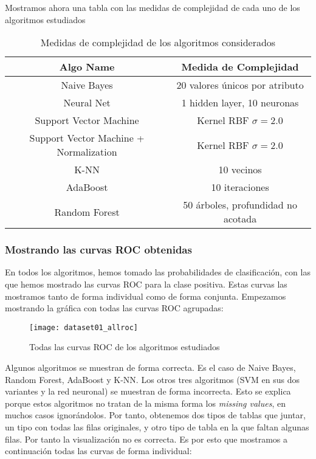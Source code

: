 \documentclass[11pt]{article}
\begin{document}
Mostramos ahora una tabla con las medidas de complejidad de cada uno de los algoritmos estudiados

\begin{table}[H]
\begin{center}
    \begin{tabular}{|c|c|}
        \hline
        Algo Name & Medida de Complejidad \\
        \hline
        Naive Bayes& 20 valores únicos por atributo \\
        Neural Net & 1 hidden layer, 10 neuronas \\
        Support Vector Machine& Kernel RBF $\sigma = 2.0$ \\
        Support Vector Machine + Normalization& Kernel RBF $\sigma = 2.0$ \\
        K-NN& 10 vecinos \\
        AdaBoost& 10 iteraciones \\
        Random Forest& 50 árboles, profundidad no acotada \\
        \hline
    \end{tabular}
\end{center}
    \caption{Medidas de complejidad de los algoritmos considerados}
\end{table}

\pagebreak

\subsubsection{Mostrando las curvas ROC obtenidas}

En todos los algoritmos, hemos tomado las probabilidades de clasificación, con las que hemos mostrado las curvas ROC para la clase positiva. Estas curvas las mostramos tanto de forma individual como de forma conjunta. Empezamos mostrando la gráfica con todas las curvas ROC agrupadas:

\begin{figure}[H]
    \centering
    \texttt{[image: dataset01\_allroc]}
    \caption{Todas las curvas ROC de los algoritmos estudiados}
    \label{workflow_general:imagen}
\end{figure}

Algunos algoritmos se muestran de forma correcta. Es el caso de Naive Bayes, Random Forest, AdaBoost y K-NN. Los otros tres algoritmos (SVM en sus dos variantes y la red neuronal) se muestran de forma incorrecta. Esto se explica porque estos algoritmos no tratan de la misma forma los \emph{missing values}, en muchos casos ignorándolos. Por tanto, obtenemos dos tipos de tablas que juntar, un tipo con todas las filas originales, y otro tipo de tabla en la que faltan algunas filas. Por tanto la visualización no es correcta. Es por esto que mostramos a continuación todas las curvas de forma individual:
\end{document}
